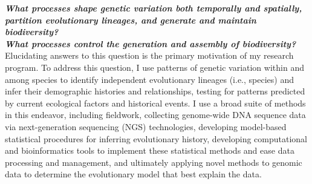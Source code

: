 \documentclass[10pt]{article}
\begin{document}
\raggedright
\singlespacing

\textbf{\textit{What processes shape genetic variation both temporally and
        spatially, partition evolutionary lineages, and generate and maintain
        biodiversity?}} \\
\textbf{\textit{What processes control the generation and assembly of
        biodiversity?}} \\
Elucidating answers to this question is the primary motivation of my research
program.
To address this question, I use patterns of genetic variation within and among
species to identify independent evolutionary lineages (i.e., species) and infer
their demographic histories and relationships, testing for patterns predicted
by current ecological factors and historical events.
I use a broad suite of methods in this endeavor, including
fieldwork,
collecting genome-wide DNA sequence data via next-generation sequencing (NGS)
technologies,
developing model-based statistical procedures for inferring evolutionary
history,
developing computational and bioinformatics tools to implement these
statistical methods and ease data processing and management,
and ultimately applying novel methods to genomic data to determine the
evolutionary model that best explain the data.
\end{document}
